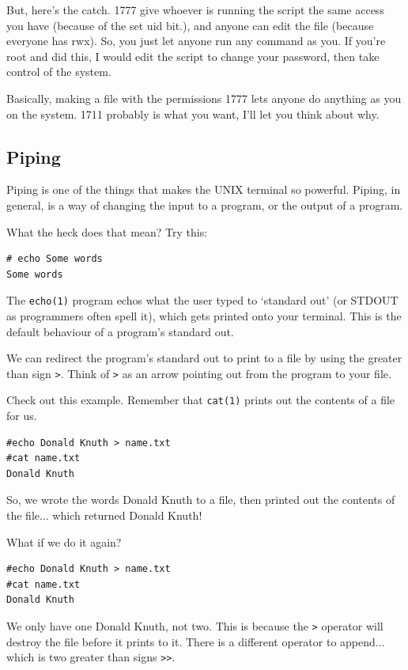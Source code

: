But, here's the catch.  1777 give whoever is running the script the same access you have (because of the set uid bit.), 
and anyone can edit the file (because everyone has rwx). So, you just let anyone run any command as you. If you're root 
and did this, I would edit the script to change your password, then take control of the system. 

Basically, making a file with the permissions 1777 lets anyone do anything as you on the system. 1711 probably is what you want,
I'll let you think about why.

\subsection {Piping}
Piping is one of the things that makes the UNIX terminal so powerful. Piping,
in general, is a way of changing the input to a program, or the output of a program.

What the heck does that mean? Try this:

\begin{verbatim}
# echo Some words
Some words
\end{verbatim}

The {\tt echo(1)} program echos what the user typed to `standard out' (or STDOUT as 
programmers often spell it), which 
gets printed onto your terminal. This is the default behaviour of a program's standard
out.
	
We can redirect the program's standard out to print to a file by using the greater
than sign {\tt >}. Think of {\tt >} as an arrow pointing out from the program to your file.

Check out this example. Remember that {\tt cat(1)} prints out the contents of a file for us.

\begin{verbatim}
#echo Donald Knuth > name.txt
#cat name.txt 
Donald Knuth
\end{verbatim}

So, we wrote the words Donald Knuth to a file, then printed out the contents of the
file... which returned Donald Knuth!

What if we do it again?
\begin{verbatim}
#echo Donald Knuth > name.txt
#cat name.txt 
Donald Knuth
\end{verbatim}

We only have one Donald Knuth, not two. This is because the {\tt >}	operator
will destroy the file before it prints to it. There is a different operator
to append... which is two greater than signs {\tt >>}.


